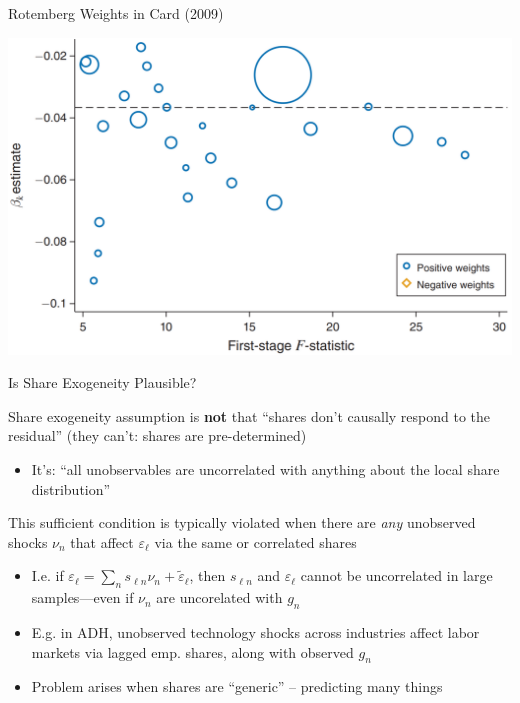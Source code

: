 \documentclass{beamer}
\begin{document}
\begin{frame}{Rotemberg Weights in Card (2009)}
\vspace{-0.5cm}
\begin{center}
\includegraphics[height=0.8\textheight]{lecture_includes/card_weights.png}
\end{center}
\end{frame}

\begin{frame}{Is Share Exogeneity Plausible?}


 Share exogeneity assumption is \textbf{not} that ``shares don't causally respond to the residual'' (they can't: shares are pre-determined)
	\begin{itemize}
	\item It's: ``all unobservables are uncorrelated with anything about the local share distribution''
	\end{itemize}\bigskip\pause{}

This sufficient condition is typically violated when there are \emph{any} unobserved shocks $\nu_n$ that affect $\varepsilon_\ell$ via the same or correlated shares
\smallskip
	\begin{itemize}
	\item %
	I.e. if $\varepsilon_\ell=\sum_n s_{\ell n}\nu_n+\tilde{\varepsilon}_\ell$, then $s_{\ell n}$ and $\varepsilon_\ell$ cannot be uncorrelated in large samples---even if $\nu_n$ are uncorelated with $g_n$\smallskip
	\item E.g. in ADH, unobserved technology shocks across industries affect labor markets via lagged emp. shares, along with observed $g_n$\smallskip
	\item Problem arises when shares are ``generic'' -- predicting many things
	\end{itemize}\bigskip
\end{frame}
\end{document}

